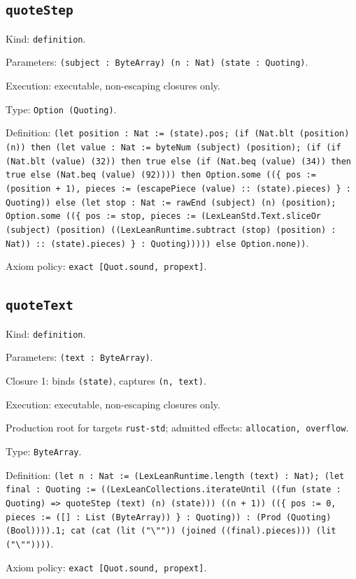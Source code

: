 \documentclass[11pt]{article}
\begin{document}
\subsection*{\texttt{quoteStep}}
\noindent Kind: \texttt{definition}.\par
\noindent Parameters: \texttt{(subject : ByteArray) (n : Nat) (state : Quoting)}.\par
\noindent Execution: executable, non-escaping closures only.\par
\noindent Type: \texttt{Option (Quoting)}.\par
\noindent Definition: \texttt{(let position : Nat := (state).pos; (if (Nat.blt (position) (n)) then (let value : Nat := byteNum (subject) (position); (if (if (Nat.blt (value) (32)) then true else (if (Nat.beq (value) (34)) then true else (Nat.beq (value) (92)))) then Option.some ((\{ pos := (position + 1), pieces := (escapePiece (value) :: (state).pieces) \} : Quoting)) else (let stop : Nat := rawEnd (subject) (n) (position); Option.some ((\{ pos := stop, pieces := (LexLeanStd.Text.sliceOr (subject) (position) ((LexLeanRuntime.subtract (stop) (position) : Nat)) :: (state).pieces) \} : Quoting))))) else Option.none))}.\par
\noindent Axiom policy: \texttt{exact [Quot.sound, propext]}.\par
\subsection*{\texttt{quoteText}}
\noindent Kind: \texttt{definition}.\par
\noindent Parameters: \texttt{(text : ByteArray)}.\par
\noindent Closure 1: binds \texttt{(state)}, captures \texttt{(n, text)}.\par
\noindent Execution: executable, non-escaping closures only.\par
\noindent Production root for targets \texttt{rust-std}; admitted effects: \texttt{allocation, overflow}.\par
\noindent Type: \texttt{ByteArray}.\par
\noindent Definition: \texttt{(let n : Nat := (LexLeanRuntime.length (text) : Nat); (let final : Quoting := ((LexLeanCollections.iterateUntil ((fun (state : Quoting) => quoteStep (text) (n) (state))) ((n + 1)) ((\{ pos := 0, pieces := ([] : List (ByteArray)) \} : Quoting)) : (Prod (Quoting) (Bool)))).1; cat (cat (lit ("\textbackslash{}"")) (joined ((final).pieces))) (lit ("\textbackslash{}""))))}.\par
\noindent Axiom policy: \texttt{exact [Quot.sound, propext]}.\par
\end{document}
